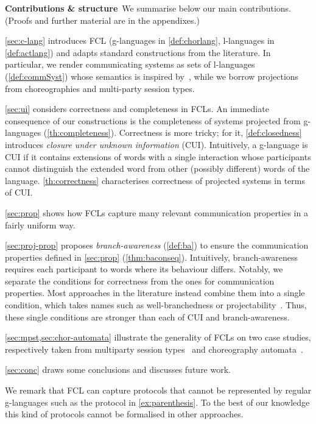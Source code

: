 \noindent\textbf{Contributions \& structure}\
We summarise below our main contributions.
%
(Proofs and further material are in the appendixes.)

\cref{sec:c-lang} introduces FCL (g-languages in \cref{def:chorlang},
l-languages in \cref{def:actlang}) and adapts standard constructions from
the literature.
%
In particular, we render communicating systems as sets of l-languages
(\cref{def:commSyst}) whose semantics is inspired by~\cite{bz83},
while we borrow projections from choreographies and multi-party
session types.

\cref{sec:ui} considers correctness and completeness in FCLs.
%
An immediate consequence of our constructions is the completeness of
systems projected from g-languages (\cref{th:completeness}).
%
Correctness is more tricky; for it, \cref{def:closedness} introduces
\emph{closure under unknown information} (CUI).
%
  Intuitively, a g-language is CUI if it contains extensions of words with a single interaction whose participants cannot distinguish the extended word from other (possibly different) words of the language.
% 
\cref{th:correctness} characterises correctness of projected systems
in terms of CUI.

\cref{sec:prop} shows how FCLs capture many relevant communication
properties in a fairly uniform way.
%

\cref{sec:proj-prop} proposes \emph{branch-awareness} (\cref{def:ba})
to ensure the communication properties defined in \cref{sec:prop} (\cref{thm:baconseq}).
%
Intuitively, branch-awareness requires each participant to
 words where its behaviour differs.
%
Notably, we separate the conditions for correctness from the ones for communication properties. Most approaches in the literature instead combine them into a single condition, which takes names such as well-branchedness or projectability~\cite{hlvlcmmprttz16}.
Thus, these single conditions are stronger than each of CUI and branch-awareness.
%

\cref{sec:mpst,sec:chor-automata} illustrate the generality of FCLs on
two case studies, respectively taken from multiparty session types~\cite{SeveriD19} and
choreography automata~\cite{blt20}.

\cref{sec:conc} draws some conclusions and discusses future work.

We remark that FCL can capture protocols that cannot be represented by
regular g-languages such as the \quo{task dispatching} protocol in
\cref{ex:parenthesis}.
%
To the best of our knowledge this kind of protocols cannot be formalised in other approaches.

